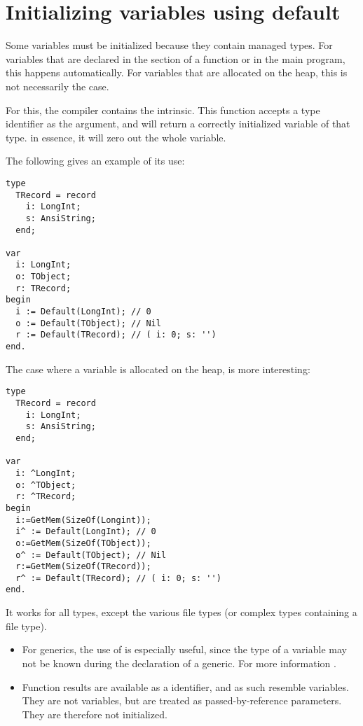 \section{Initializing variables using default}
\label{se:initusingdefault}
Some variables must be initialized because they contain managed types. 
For variables that are declared in the   section of a function or in the main program, this happens automatically.
For variables that are allocated on the heap, this is not necessarily the case.

For this, the compiler contains the  intrinsic. This function accepts a type identifier as the argument, 
and will return a correctly initialized variable of that type. in essence, it will zero out the whole variable.

The following gives an example of its use:
\begin{verbatim}
type
  TRecord = record
    i: LongInt;
    s: AnsiString;
  end;
 
var
  i: LongInt;
  o: TObject;
  r: TRecord;
begin
  i := Default(LongInt); // 0
  o := Default(TObject); // Nil
  r := Default(TRecord); // ( i: 0; s: '')
end.
\end{verbatim}
The case where a variable is allocated on the heap, is more interesting:
\begin{verbatim}
type
  TRecord = record
    i: LongInt;
    s: AnsiString;
  end;
 
var
  i: ^LongInt;
  o: ^TObject;
  r: ^TRecord;
begin
  i:=GetMem(SizeOf(Longint));
  i^ := Default(LongInt); // 0
  o:=GetMem(SizeOf(TObject));
  o^ := Default(TObject); // Nil
  r:=GetMem(SizeOf(TRecord));
  r^ := Default(TRecord); // ( i: 0; s: '')
end.
\end{verbatim}
It works for all types, except the various file types (or complex types containing a file type).

\begin{remark}
\begin{itemize}
\item 
For generics, the use of  is especially useful, since the type of a variable may not 
be known during the declaration of a generic. For more information .
\item
Function results are available as a  identifier, and as such
resemble variables. They are not variables, but are treated as passed-by-reference
parameters. They are therefore not initialized.
\end{itemize}
\end{remark}

